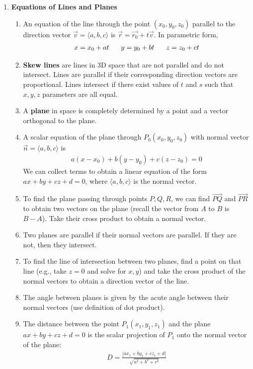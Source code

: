 \documentclass[10pt]{article}
\begin{document}
\begin{multicols*}{2}
\begin{enumerate}
\item \textbf{Equations of Lines and Planes}
\begin{enumerate}
    \item An equation of the line through the point $(x_0, y_0, z_0)$ parallel to the direction vector $\vec{v} = \langle a, b, c \rangle$ is $\vec{r} = \vec{r_0} + t\vec{v}$. In parametric form,
    \begin{align*}
        x = x_0 + at \hspace{6mm}
        y = y_0 + bt \hspace{6mm}
        z = z_0 + ct
    \end{align*}
    
    \item \textbf{Skew lines} are lines in 3D space that are not parallel and do not intersect. Lines are parallel if their corresponding direction vectors are proportional. Lines intersect if there exist values of $t$ and $s$ such that $x,y,z$ parameters are all equal.
    
    \item A \textbf{plane} in space is completely determined by a point and a vector orthogonal to the plane. 
    \item A scalar equation of the plane through $P_0(x_0, y_0, z_0)$ with normal vector $\vec{n} = \langle a,b,c \rangle$ is 
    \begin{align*}
        a(x-x_0) + b(y-y_0) + c(z-z_0) = 0
    \end{align*}
    We can collect terms to obtain a linear equation of the form $ax+by+cz+d=0$, where $\langle a,b,c \rangle$ is the normal vector.
    \item To find the plane passing through points $P,Q,R$, we can find $\vec{PQ}$ and $\vec{PR}$ to obtain two vectors on the plane (recall the vector from $A$ to $B$ is $B-A$). Take their cross product to obtain a normal vector.
    \item Two planes are parallel if their normal vectors are parallel. If they are not, then they intersect. 
    \item To find the line of intersection between two planes, find a point on that line (e.g., take $z=0$ and solve for $x,y$) and take the cross product of the normal vectors to obtain a direction vector of the line. 
    \item The angle between planes is given by the acute angle between their normal vectors (use definition of dot product).
    \item The distance between the point $P_1(x_1,y_1,z_1)$ and the plane $ax+by+cz+d=0$ is the scalar projection of $P_1$ onto the normal vector of the plane:
    \begin{align*}
        D = \frac{|ax_1 + by_1+cz_1+d|}{\sqrt{a^2+b^2+c^2}}
    \end{align*}
\end{enumerate}


\end{enumerate}
\end{multicols*}
\end{document}

